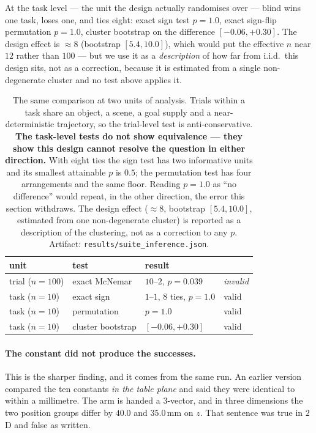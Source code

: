 \documentclass[10pt,twocolumn]{article}
\begin{document}
At the task level --- the unit
the design actually randomises over --- blind wins one task, loses one, and ties
eight: exact sign test $p = 1.0$, exact sign-flip permutation $p = 1.0$,
cluster bootstrap on the difference $[-0.06, +0.30]$. The design effect is
$\approx 8$ (bootstrap $[5.4, 10.0]$), which would put the effective $n$ near
$12$ rather than $100$ --- but we use it as a \emph{description} of how far
from i.i.d.\ this design sits, not as a correction, because it is estimated
from a single non-degenerate cluster and no test above applies it.

\begin{table}[h]\centering\footnotesize
\setlength{\tabcolsep}{4pt}
\begin{tabular}{llll}
\toprule
unit & test & result & \\
\midrule
trial ($n{=}100$) & exact McNemar & $10$--$2$, $p = 0.039$ & \emph{invalid} \\
task ($n{=}10$) & exact sign & $1$--$1$, 8 ties, $p = 1.0$ & valid \\
task ($n{=}10$) & permutation & $p = 1.0$ & valid \\
task ($n{=}10$) & cluster bootstrap & $[-0.06, +0.30]$ & valid \\
\bottomrule
\end{tabular}
\caption{The same comparison at two units of analysis. Trials within a task
share an object, a scene, a goal supply and a near-deterministic trajectory, so
the trial-level test is anti-conservative. \textbf{The task-level tests do not
show equivalence --- they show this design cannot resolve the question in
either direction.} With eight ties the sign test has two informative units and
its smallest attainable $p$ is $0.5$; the permutation test has four
arrangements and the same floor. Reading $p = 1.0$ as ``no difference'' would
repeat, in the other direction, the error this section withdraws. The design
effect ($\approx 8$, bootstrap $[5.4, 10.0]$, estimated from one non-degenerate
cluster) is reported as a description of the clustering, not as a correction to
any $p$. Artifact: \texttt{results/suite\_inference.json}.}
\label{tab:fullsuite}
\end{table}

\paragraph{The constant did not produce the successes.} This is the sharper
finding, and it comes from the same run. An earlier version compared the ten constants \emph{in the table plane} and said they were
identical to within a millimetre. The arm is handed a $3$-vector, and in three
dimensions the two position groups differ by $40.0$ and $35.0$\,mm on $z$. That
sentence was true in $2$D and false as written.
\end{document}

